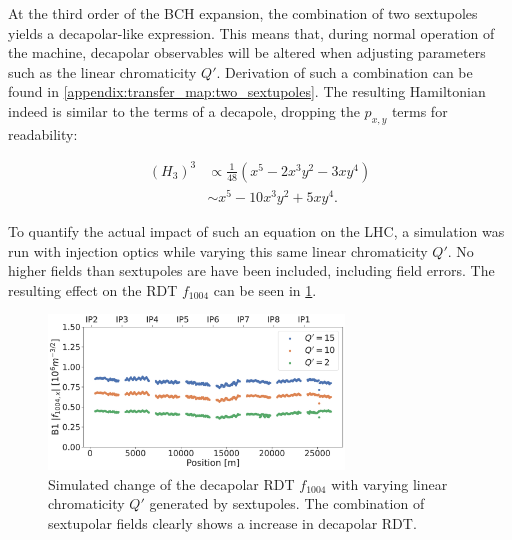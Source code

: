 

\subsubsection{}

At the third order of the BCH expansion, the combination of two sextupoles yields a decapolar-like
expression. This means that, during normal operation of the machine, decapolar observables will be
altered when adjusting parameters such as the linear chromaticity $Q'$. 
Derivation of such a combination can be found in \cref{appendix:transfer_map:two_sextupoles}. The
resulting Hamiltonian indeed is similar to the terms of a decapole, dropping the $p_{x,y}$ terms for
readability:

\begin{equation}
    \begin{aligned}
         (H_3)^3 &\propto \frac{1}{48} \left(x^5 - 2x^3y^2 - 3xy^4 \right)\\
                 &\sim    x^5 - 10x^3y^2 + 5xy^4.
    \end{aligned}
    \label{eq:decapoles:sextupoles_b5}
\end{equation}

To quantify the actual impact of such an equation on the LHC, a simulation was run with injection
optics while varying this same linear chromaticity $Q'$. No higher fields than sextupoles are 
have been included, including field errors. The resulting effect on the RDT $f_{1004}$
can be seen in \cref{fig:decapoles:rdts:simulated_f1004_from_sextupoles}.

\begin{figure}[H]
    \centering
    \includegraphics[width=0.7\textwidth]{./images/f1004/f1004_dq.pdf}
    \caption{Simulated change of the decapolar RDT $f_{1004}$ with varying linear
    chromaticity $Q'$ generated by sextupoles. The combination of sextupolar fields clearly shows a 
    increase in decapolar RDT.}
    \label{fig:decapoles:rdts:simulated_f1004_from_sextupoles}
\end{figure}

